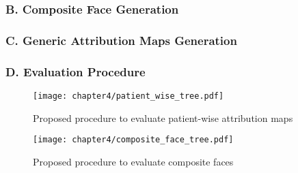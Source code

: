 \documentclass[../report.tex]{subfiles}
\begin{document}
    \subsubsection{B. Composite Face Generation}
    \subsubsection{C. Generic Attribution Maps Generation}
    \subsubsection{D. Evaluation Procedure}
     \begin{figure}[ht]    
    	\texttt{[image: chapter4/patient\_wise\_tree.pdf]}
    	\caption{Proposed procedure to evaluate patient-wise attribution maps}
    \end{figure}
	\begin{figure}[ht]    
		\texttt{[image: chapter4/composite\_face\_tree.pdf]}
		\caption{Proposed procedure to evaluate composite faces}
	\end{figure}
\end{document}
